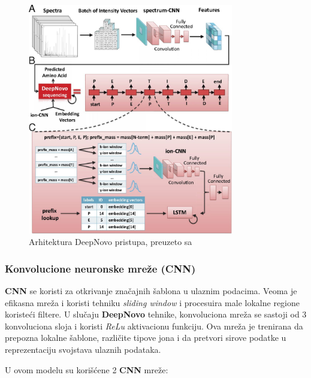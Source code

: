 \documentclass[12pt,oneside]{memoir}
\begin{document}
\begin{figure}[H]
\centering
\includegraphics[width=0.8\textwidth]{images/deep_novo_architecture.jpeg}
\caption{Arhitektura DeepNovo pristupa, preuzeto sa \cite{deepnovo}}
\label{fig:arhitektura}
\end{figure}

\subsubsection{Konvolucione neuronske mreže (CNN)}
\textbf{CNN} se koristi za otkrivanje značajnih šablona u ulaznim podacima. Veoma je efikasna mreža i koristi tehniku \emph{sliding window} i procesuira male lokalne regione koristeći filtere. U slučaju \textbf{DeepNovo} tehnike, konvoluciona mreža se sastoji od 3 konvoluciona sloja i koristi \emph{ReLu} aktivacionu funkciju. Ova mreža je trenirana da prepozna lokalne šablone, različite tipove jona i da pretvori sirove podatke u reprezentaciju svojstava ulaznih podataka.

U ovom modelu su korišćene 2 \textbf{CNN} mreže:
\end{document}
